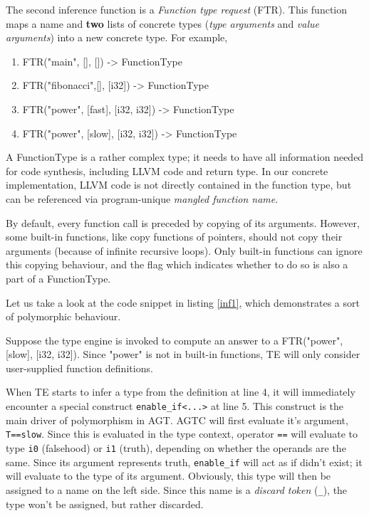 \documentclass[times, utf8, diplomski]{fer}
\theoremstyle{definition}
\newcommand{\textcode}[3]{
    
}
\begin{document}
The second inference function is a \textit{Function type request} (FTR). This function maps
a name and \textbf{two} lists of concrete types (\textit{type arguments} and \textit{value arguments}) 
into a new concrete type. For example,

\begin{enumerate}
    \item FTR("main", [], []) -> FunctionType
    \item FTR("fibonacci",[], [i32]) -> FunctionType
    \item FTR("power", [fast], [i32, i32]) -> FunctionType
    \item FTR("power", [slow], [i32, i32]) -> FunctionType
\end{enumerate}

A FunctionType is a rather complex type; it needs to have all information needed for code synthesis, 
including LLVM code and return type. In our concrete implementation, LLVM code is not directly
contained in the function type, but can be referenced via program-unique \textit{mangled function name}.

By default, every function call is preceded by copying of its arguments. However, some built-in functions,
like copy functions of pointers, should not copy their arguments (because of infinite recursive loops).
Only built-in functions can ignore this copying behaviour, and the flag which indicates
whether to do so is also a part of a FunctionType.

Let us take a look at the code snippet in listing \ref{inf1}, 
which demonstrates a sort of polymorphic behaviour.

\textcode{\resdir/compiler/inf1.agt}{inf1}{enable\_if example}

Suppose the type engine is invoked to compute an answer to a FTR("power", [slow], [i32, i32]).
Since "power" is not in built-in functions, TE will only consider user-supplied function definitions.

When TE starts to infer a type from the definition at line 4, it will immediately encounter a special
construct \texttt{enable\_if<...>} at line 5. This construct is the main driver of polymorphism in AGT.
AGTC will first evaluate it's argument, \texttt{T==slow}. Since this is evaluated in the type context,
operator \texttt{==} will evaluate to type \texttt{i0} (falsehood) or \texttt{i1} (truth), depending on 
whether the operands are the same.
Since its argument represents truth, \texttt{enable\_if} will act as if didn't exist;
it will evaluate to the type of its argument.
Obviously, this type will then be assigned to a name on the left side. 
Since this name is a \textit{discard token}
(\texttt{\_}), the type won't be assigned, but rather discarded.
\end{document}
